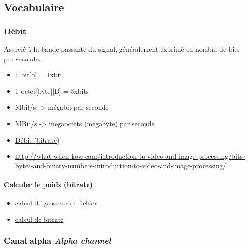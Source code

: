 \documentclass[
  french,
]{book}
\providecommand{\tightlist}{%
  \setlength{\itemsep}{0pt}\setlength{\parskip}{0pt}}
\begin{document}
\hypertarget{vocabulaire}{%
\subsection{Vocabulaire}\label{vocabulaire}}

\hypertarget{duxe9bit}{%
\subsubsection{Débit}\label{duxe9bit}}

Associé à la bande passante du signal, généralement exprimé en nombre de bits par seconde.

\begin{itemize}
\item
  1 bit{[}b{]} = 1xbit
\item
  1 octet{[}byte{]}{[}B{]} = 8xbits
\item
  Mbit/s -\textgreater{} mégabit par seconde
\item
  MBit/s -\textgreater{} mégaoctets (megabyte) par seconde
\item
  \href{https://en.wikipedia.org/wiki/Bit_rate\#Video}{Débit (bitrate)}
\item
  \url{http://what-when-how.com/introduction-to-video-and-image-processing/bits-bytes-and-binary-numbers-introduction-to-video-and-image-processing/}
\end{itemize}

\hypertarget{calculer-le-poids-bitrate}{%
\paragraph{Calculer le poids (bitrate)}\label{calculer-le-poids-bitrate}}

\begin{itemize}
\tightlist
\item
  \href{https://toolstud.io/video/filesize.php?imagewidth=1920\&imageheight=1080\&framerate=29.97\&timeduration=60\&timeunit=seconds}{calcul de grosseur de fichier}
\item
  \href{https://toolstud.io/video/bitrate.php?imagewidth=1\&imageheight=1\&colordepth=24\&framerate=29.97}{calcul de bitrate}
\end{itemize}

\hypertarget{canal-alpha-alpha-channel}{%
\subsubsection{\texorpdfstring{Canal alpha \emph{Alpha channel}}{Canal alpha Alpha channel}}\label{canal-alpha-alpha-channel}}
\end{document}
